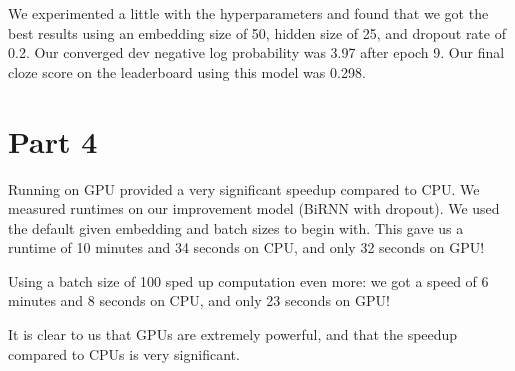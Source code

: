 \documentclass{article}
\begin{document}
We experimented a little with the hyperparameters and found that we got the best results using an embedding size of 50, hidden size of 25, and dropout rate of 0.2. Our converged dev negative log probability was 3.97 after epoch 9. Our final cloze score on the leaderboard using this model was 0.298. 

\section{Part 4}

Running on GPU provided a very significant speedup compared to CPU. We measured runtimes on our improvement model (BiRNN with dropout). We used the default given embedding and batch sizes to begin with. This gave us a runtime of 10 minutes and 34 seconds on CPU, and only 32 seconds on GPU!

Using a batch size of 100 sped up computation even more: we got a speed of 6 minutes and 8 seconds on CPU, and only 23 seconds on GPU!

It is clear to us that GPUs are extremely powerful, and that the speedup compared to CPUs is very significant.
\end{document}

